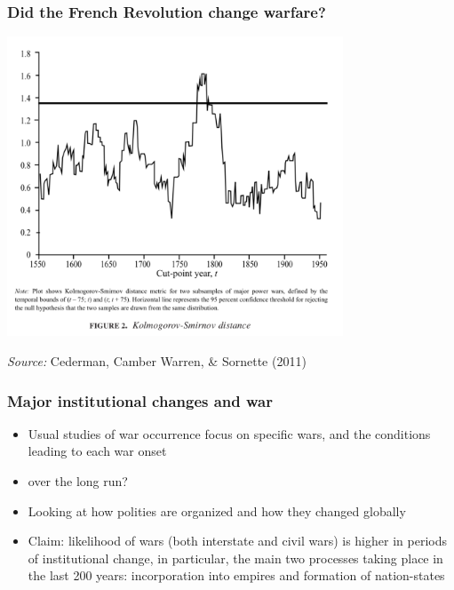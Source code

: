 \documentclass[aspectratio=43, handout]{beamer}
\begin{document}
\begin{frame}
\frametitle{Did the French Revolution change warfare?}
\centering

\includegraphics[width = 0.75\textwidth]{img/cederman_et_al_fig2}

{\scriptsize \textit{Source:} Cederman, Camber Warren, \& Sornette (2011)}

\end{frame}

\begin{frame}
\frametitle{Major institutional changes and war}
\centering

\begin{itemize}
  \item Usual studies of war occurrence focus on specific wars, and the conditions leading to each war onset
  \item {} over the long run?
  \item Looking at how polities are organized and how they changed globally
  \item Claim: likelihood of wars (both interstate and civil wars) is higher in periods of institutional change, in particular, the main two processes taking place in the last 200 years: incorporation into empires and formation of nation-states
\end{itemize}

\end{frame}
\end{document}
